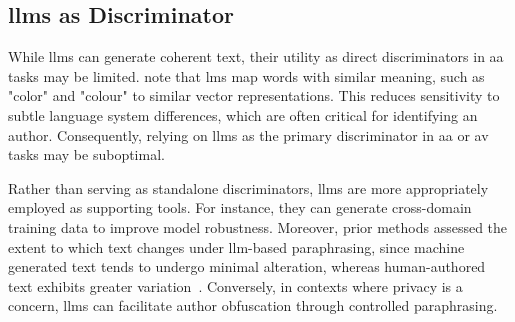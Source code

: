 \subsection{\acp{llm} as Discriminator}
\label{sec:llm_discriminator}

While \acp{llm} can generate coherent text, their utility as direct discriminators in \ac{aa} tasks may be limited. 
\citet{altakrori_topic_2021} note that \acp{lm} map words with similar meaning, such as "color" and "colour" to similar vector representations.
This reduces sensitivity to subtle language system differences, which are often critical for identifying an author. 
Consequently, relying on \acp{llm} as the primary discriminator in \ac{aa} or \ac{av} tasks may be suboptimal.

Rather than serving as standalone discriminators, \acp{llm} are more appropriately employed as supporting tools. 
For instance, they can generate cross-domain training data to improve model robustness. 
Moreover, prior methods assessed the extent to which text changes under \ac{llm}-based paraphrasing, since machine generated text tends to undergo minimal alteration, whereas human-authored text exhibits greater variation~\citep{mao_raidar_2024}.
Conversely, in contexts where privacy is a concern, \acp{llm} can facilitate author obfuscation through controlled paraphrasing. 